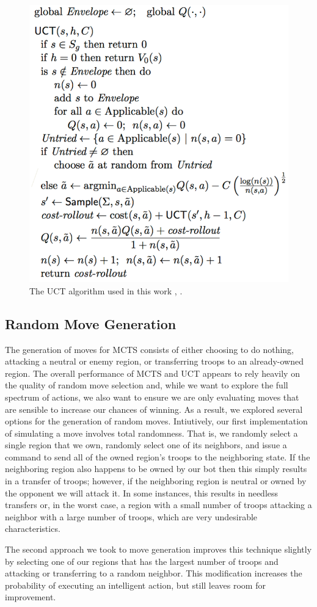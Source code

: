 \documentclass[a4paper,11pt]{article}
\begin{document}
%
\begin{figure}[!htbp]
  \centering
  \includegraphics[width=0.45\columnwidth]{uct_algorithm}
  \caption{The UCT algorithm used in this work \cite{Nau2015}, \cite{NauLecture}.}
  \label{fig:uct_alg}
\end{figure}
%


\subsection{Random Move Generation}\label{sec:move_gen}
The generation of moves for MCTS consists of either choosing to do nothing, attacking a neutral 
or enemy region, or transferring troops to an already-owned region. The overall performance of 
MCTS and UCT appears to rely heavily on the quality of random move selection and, while we want to
explore the full spectrum of actions, we also want to ensure we are only evaluating moves that are
sensible to increase our chances of winning. As a result, we explored several options for the 
generation of random moves. Intiutively, our first implementation of simulating a move involves total 
randomness.  That is, we randomly select a single region that we own, randomly select one of its 
neighbors, and issue a command to send all of the owned region's troops to the neighboring state.  
If the neighboring region also happens to be owned by our bot then this simply results in a transfer 
of troops; however, if the neighboring region is neutral or owned by the opponent we will attack it. 
In some instances, this results in needless transfers or, in the worst case, a region with a small 
number of troops attacking a neighbor with a large number of troops, which are very undesirable 
characteristics. 

The second approach we took to move generation improves this technique slightly by selecting one of 
our regions that has the largest number of troops and attacking or transferring to a random neighbor.  
This modification increases the probability of executing an intelligent action, but still leaves room 
for improvement.
\end{document}
